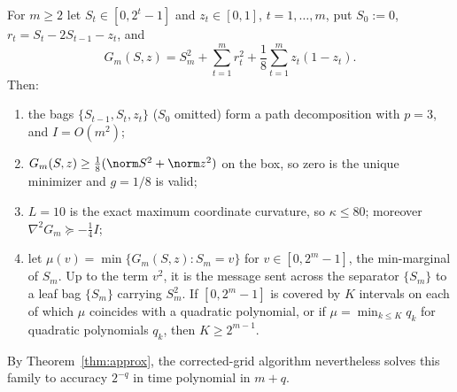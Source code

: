 \begin{proposition}
\label{lim:prop:messages}
For $m\ge2$ let $S_t\in[0,2^t-1]$ and $z_t\in[0,1]$, $t=1,\ldots,m$, put
$S_0:=0$, $r_t=S_t-2S_{t-1}-z_t$, and
\[
G_m(S,z)=S_m^2+\sum_{t=1}^mr_t^2+\frac18\sum_{t=1}^mz_t(1-z_t).
\]
Then:
\begin{enumerate}
\item the bags $\{S_{t-1},S_t,z_t\}$ ($S_0$ omitted) form a path
  decomposition with $p=3$, and $I=O(m^2)$;
\item $G_m(S,z)\ge\frac18(\norm S^2+\norm z^2)$ on the box, so zero is the
  unique minimizer and $g=1/8$ is valid;
\item $L=10$ is the exact maximum coordinate curvature, so $\kappa\le80$;
  moreover $\nabla^2G_m\succeq-\frac14I$;
\item let $\mu(v)=\min\{G_m(S,z):S_m=v\}$ for $v\in[0,2^m-1]$, the
  min-marginal of $S_m$. Up to the term $v^2$, it is the message sent
  across the separator $\{S_m\}$ to a leaf bag $\{S_m\}$ carrying $S_m^2$.
  If $[0,2^m-1]$ is covered by
  $K$ intervals on each of which $\mu$ coincides with a quadratic
  polynomial, or if $\mu=\min_{k\le K}q_k$ for quadratic polynomials $q_k$,
  then $K\ge2^{m-1}$.
\end{enumerate}
By Theorem~\ref{thm:approx}, the corrected-grid algorithm nevertheless
solves this family to accuracy $2^{-q}$ in time polynomial in $m+q$.
\end{proposition}

